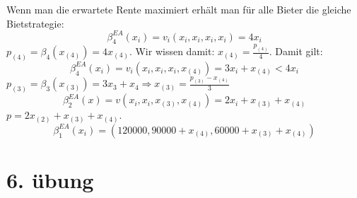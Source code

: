 \documentclass[12pt]{extreport} %
\theoremstyle{named}
\theoremstyle{nnamed}
\theoremstyle{itshape}
\theoremstyle{normal}
\begin{document}
Wenn man die erwartete Rente maximiert erhält man für alle Bieter die gleiche Bietstrategie:
$$ \beta_{4}^{EA}(x_{i}) = v_{i}(x_{i}, x_{i}, x_{i}, x_{i}) = 4 x_{i} $$
$p_{(4)} = \beta_{4}(x_{(4)}) = 4 x_{(4)}$. Wir wissen damit: $x_{(4)} = \frac{p_{(4)}}{4}$. Damit gilt:
$$  \beta_{4}^{EA}(x_{i}) = v_{i}(x_{i}, x_{i}, x_{i}, x_{(4)}) = 3 x_{i} + x_{(4)} < 4 x_{i}  $$
$p_{(3)} = \beta_{3}(x_{(3)}) = 3x_{3} + x_{4} \Rightarrow x_{(3)} = \frac{p_{(3)} - x_{(4)}}{3}$
$$ \beta_{2}^{EA}(x) = v(x_{i}, x_{i}, x_{(3)}, x_{(4)}) = 2x_{i} + x_{(3)} + x_{(4)} $$
$p = 2x_{(2)} + x_{(3)} + x_{(4)}$.
$$ \beta_{1}^{EA}(x_{i}) =\left( 120000, 90000 + x_{(4)}, 60000 + x_{(3)} + x_{(4)} \right) $$

\section*{6. übung}
\end{document}
